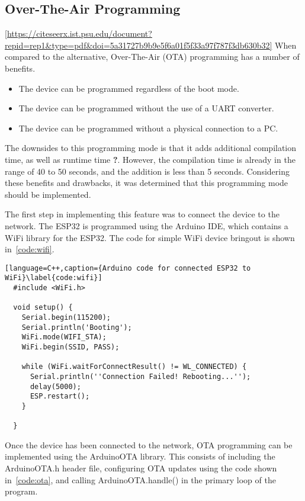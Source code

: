 \subsection{Over-The-Air Programming}
\ref{https://citeseerx.ist.psu.edu/document?repid=rep1&type=pdf&doi=5a31727b9b9e5f6a01f5f33a97f787f3db630b32}
When compared to the alternative, Over-The-Air (OTA) programming has a number of benefits.

\begin{itemize}
        \item The device can be programmed regardless of the boot mode.
        \item The device can be programmed without the use of a UART converter.
        \item The device can be programmed without a physical connection to a PC.
\end{itemize}

The downsides to this programming mode is that it adds additional compilation time, as well as runtime time \textbf{?}.
However, the compilation time is already in the range of 40 to 50 seconds, and the addition is less than 5 seconds.
Considering these benefits and drawbacks, it was determined that this programming mode should be implemented.

The first step in implementing this feature was to connect the device to the network.
The ESP32 is programmed using the Arduino IDE, which contains a WiFi library for the ESP32.
The code for simple WiFi device bringout is shown in~\autoref{code:wifi}.

\begin{lstlisting}[language=C++,caption={Arduino code for connected ESP32 to WiFi}\label{code:wifi}]
  #include <WiFi.h>

  void setup() {
    Serial.begin(115200);
    Serial.println('Booting');
    WiFi.mode(WIFI_STA);
    WiFi.begin(SSID, PASS);

    while (WiFi.waitForConnectResult() != WL_CONNECTED) {
      Serial.println(''Connection Failed! Rebooting...'');
      delay(5000);
      ESP.restart();
    }

  }
\end{lstlisting}

Once the device has been connected to the network, OTA programming can be implemented using the ArduinoOTA library.
This consists of including the ArduinoOTA.h header file,
configuring OTA updates using the code shown in~\autoref{code:ota},
and calling ArduinoOTA.handle() in the primary loop of the program.

